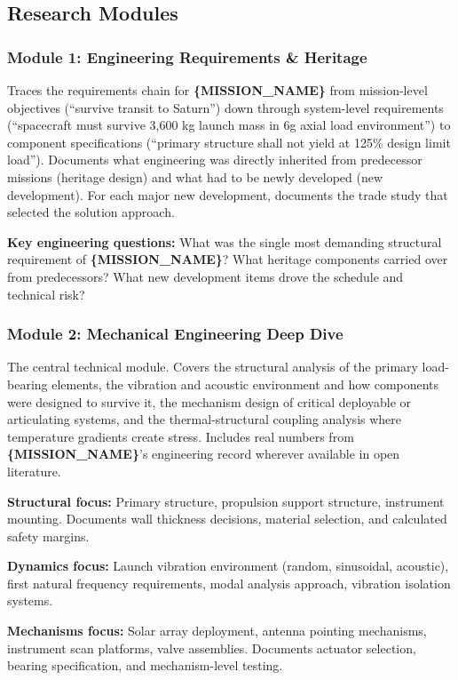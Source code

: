 \documentclass[11pt,letterpaper]{article}
\newcommand{\param}[1]{\textcolor{paramred}{\textbf{\{#1\}}}}
\begin{document}
\subsection{Research Modules}

\subsubsection{Module 1: Engineering Requirements \& Heritage}

Traces the requirements chain for \param{MISSION\_NAME} from mission-level objectives (``survive transit to Saturn'') down through system-level requirements (``spacecraft must survive 3,600 kg launch mass in 6g axial load environment'') to component specifications (``primary structure shall not yield at 125\% design limit load''). Documents what engineering was directly inherited from predecessor missions (heritage design) and what had to be newly developed (new development). For each major new development, documents the trade study that selected the solution approach.

\textbf{Key engineering questions:} What was the single most demanding structural requirement of \param{MISSION\_NAME}? What heritage components carried over from predecessors? What new development items drove the schedule and technical risk?

\subsubsection{Module 2: Mechanical Engineering Deep Dive}

The central technical module. Covers the structural analysis of the primary load-bearing elements, the vibration and acoustic environment and how components were designed to survive it, the mechanism design of critical deployable or articulating systems, and the thermal-structural coupling analysis where temperature gradients create stress. Includes real numbers from \param{MISSION\_NAME}'s engineering record wherever available in open literature.

\textbf{Structural focus:} Primary structure, propulsion support structure, instrument mounting. Documents wall thickness decisions, material selection, and calculated safety margins.

\textbf{Dynamics focus:} Launch vibration environment (random, sinusoidal, acoustic), first natural frequency requirements, modal analysis approach, vibration isolation systems.

\textbf{Mechanisms focus:} Solar array deployment, antenna pointing mechanisms, instrument scan platforms, valve assemblies. Documents actuator selection, bearing specification, and mechanism-level testing.
\end{document}
